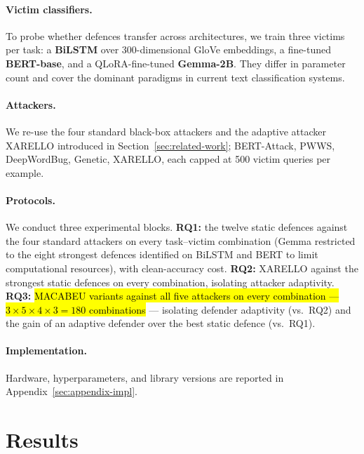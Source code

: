 \documentclass[11pt]{article}
\begin{document}
\paragraph{Victim classifiers.}
To probe whether defences transfer across architectures, we train three victims per task: a \textbf{BiLSTM} over 300-dimensional GloVe embeddings, a fine-tuned \textbf{BERT-base}, and a QLoRA-fine-tuned \textbf{Gemma-2B}. They differ in parameter count and cover the dominant paradigms in current text classification systems.

\paragraph{Attackers.}
We re-use the four standard black-box attackers and the adaptive attacker XARELLO introduced in Section~\ref{sec:related-work}; BERT-Attack, PWWS, DeepWordBug, Genetic, XARELLO, each capped at 500 victim queries per example.

\paragraph{Protocols.}
We conduct three experimental blocks. \textbf{RQ1:} the twelve static defences against the four standard attackers on every task--victim combination (Gemma restricted to the eight strongest defences identified on BiLSTM and BERT to limit computational resources), with clean-accuracy cost. \textbf{RQ2:} XARELLO against the strongest static defences on every combination, isolating attacker adaptivity. \textbf{RQ3:} \hl{MACABEU variants against all five attackers on every combination --- $3 \times 5 \times 4 \times 3 = 180$ combinations} --- isolating defender adaptivity (vs.\ RQ2) and the gain of an adaptive defender over the best static defence (vs.\ RQ1).


\paragraph{Implementation.}
Hardware, hyperparameters, and library versions are reported in Appendix~\ref{sec:appendix-impl}.





\section{Results}
 
\end{document}
